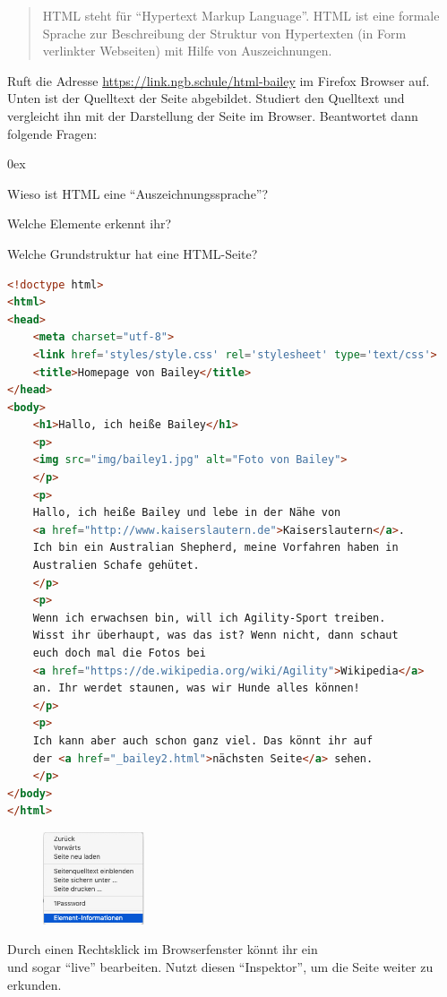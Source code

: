 \documentclass[11pt, a4paper, ngerman]{arbeitsblatt}
\begin{document}
\ReiheTitel

\begin{quote}
HTML steht für \enquote{Hypertext Markup Language}. HTML ist eine formale Sprache zur Beschreibung der Struktur von Hypertexten (in Form verlinkter Webseiten) mit Hilfe von Auszeichnungen.
\end{quote}

\begin{aufgabe}[icon=\iconComputer]
Ruft die Adresse \url{https://link.ngb.schule/html-bailey} im Firefox Browser auf. Unten ist der Quelltext der Seite abgebildet. Studiert den Quelltext und vergleicht ihn mit der Darstellung der Seite im Browser. Beantwortet dann folgende Fragen:
\begin{enuma}\itemsep 0ex
	\item Wieso ist HTML eine \enquote{Auszeichnungssprache}?
	\item Welche Elemente erkennt ihr?
	\item Welche Grundstruktur hat eine HTML-Seite?
\end{enuma}
\begin{lstlisting}[language=HTML,basicstyle=\scriptsize\ttfamily]
<!doctype html>
<html>
<head>
	<meta charset="utf-8">
	<link href='styles/style.css' rel='stylesheet' type='text/css'>
	<title>Homepage von Bailey</title>
</head>
<body>
	<h1>Hallo, ich heiße Bailey</h1>
	<p>
	<img src="img/bailey1.jpg" alt="Foto von Bailey">
	</p>
	<p>
	Hallo, ich heiße Bailey und lebe in der Nähe von
	<a href="http://www.kaiserslautern.de">Kaiserslautern</a>.
	Ich bin ein Australian Shepherd, meine Vorfahren haben in
	Australien Schafe gehütet.
	</p>
	<p>
	Wenn ich erwachsen bin, will ich Agility-Sport treiben.
	Wisst ihr überhaupt, was das ist? Wenn nicht, dann schaut
	euch doch mal die Fotos bei
	<a href="https://de.wikipedia.org/wiki/Agility">Wikipedia</a>
	an. Ihr werdet staunen, was wir Hunde alles können!
	</p>
	<p>
	Ich kann aber auch schon ganz viel. Das könnt ihr auf
	der <a href="_bailey2.html">nächsten Seite</a> sehen.
	</p>
</body>
</html>
\end{lstlisting}
\end{aufgabe}

\begin{figure}
	\includegraphics[width=3cm]{8Diff-Ab.1-Abb_Menu.jpg}
\end{figure}
\begin{aufgabe}[icon=\iconComputer]
	Durch einen Rechtsklick im Browserfenster könnt ihr ein \\
	 und sogar \enquote{live} bearbeiten. Nutzt diesen \enquote{Inspektor}, um die Seite weiter zu \\
	 erkunden.
\end{aufgabe}
\end{document}
